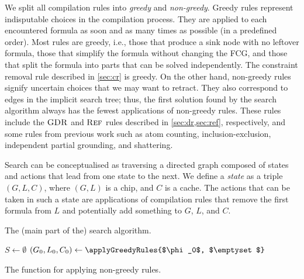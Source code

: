 We split all compilation rules into \emph{greedy} and \emph{non-greedy}. Greedy
rules represent indisputable choices in the compilation process. They are
applied to each encountered formula as soon and as many times as possible (in a
predefined order). Most rules are greedy, i.e., those that produce a sink node
with no leftover formula, those that simplify the formula without changing the
FCG, and those that split the formula into parts that can be solved
independently. The constraint removal rule described in \cref{sec:cr} is greedy.
On the other hand, non-greedy rules signify uncertain choices that we may want
to retract. They also correspond to edges in the implicit search tree; thus, the
first solution found by the search algorithm always has the fewest applications
of non-greedy rules. These rules include the $\operatorname{\textsc{GDR}}$ and $\operatorname{\textsc{Ref}}$ rules described
in \cref{sec:dr,sec:ref}, respectively, and some rules from previous work
\citep{DBLP:conf/ijcai/BroeckTMDR11} such as atom counting, inclusion-exclusion,
independent partial grounding, and shattering.

Search can be conceptualised as traversing a directed graph composed of states
and actions that lead from one state to the next. We define a \emph{state} as a
triple $(G, L, C)$, where $(G, L)$ is a chip, and $C$ is a cache. The actions
that can be taken in such a state are applications of compilation rules that
remove the first formula from $L$ and potentially add something to $G$, $L$, and
$C$.

\begin{algorithm}[t]
  \caption{The (main part of the) search algorithm.}\label{alg:search}
   $S \gets \emptyset$\;
  $(G_0, L_0, C_{0}) \gets \applyGreedyRules{$\phi_0$, $\emptyset$}$\;\label{line:greedy}
\end{algorithm}

\begin{algorithm}[t]
  \caption{The function for applying non-greedy rules.}\label{alg:applyallrules}
\end{algorithm}

